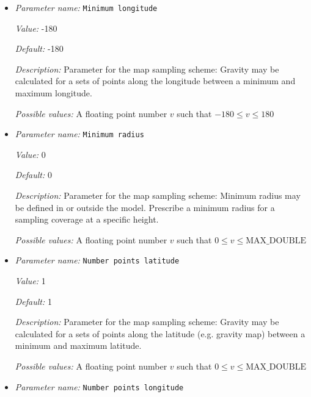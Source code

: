 \begin{itemize}
{\it Possible values:} A floating point number $v$ such that $-90 \leq v \leq 90$
\item {\it Parameter name:} {\tt Minimum longitude}
\label{parameters:Postprocess/Gravity calculation/Minimum longitude}
\label{parameters:Postprocess/Gravity_20calculation/Minimum_20longitude}


{\it Value:} -180


{\it Default:} -180


{\it Description:} Parameter for the map sampling scheme: Gravity may be calculated for a sets of points along the longitude between a minimum and maximum longitude.


{\it Possible values:} A floating point number $v$ such that $-180 \leq v \leq 180$
\item {\it Parameter name:} {\tt Minimum radius}
\label{parameters:Postprocess/Gravity calculation/Minimum radius}
\label{parameters:Postprocess/Gravity_20calculation/Minimum_20radius}


{\it Value:} 0


{\it Default:} 0


{\it Description:} Parameter for the map sampling scheme: Minimum radius may be defined in or outside the model. Prescribe a minimum radius for a sampling coverage at a specific height.


{\it Possible values:} A floating point number $v$ such that $0 \leq v \leq \text{MAX\_DOUBLE}$
\item {\it Parameter name:} {\tt Number points latitude}
\label{parameters:Postprocess/Gravity calculation/Number points latitude}
\label{parameters:Postprocess/Gravity_20calculation/Number_20points_20latitude}


{\it Value:} 1


{\it Default:} 1


{\it Description:} Parameter for the map sampling scheme: Gravity may be calculated for a sets of points along the latitude (e.g. gravity map) between a minimum and maximum latitude.


{\it Possible values:} A floating point number $v$ such that $0 \leq v \leq \text{MAX\_DOUBLE}$
\item {\it Parameter name:} {\tt Number points longitude}
\label{parameters:Postprocess/Gravity calculation/Number points longitude}
\label{parameters:Postprocess/Gravity_20calculation/Number_20points_20longitude}



\end{itemize}
